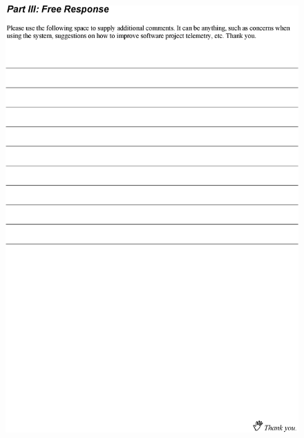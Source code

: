 \begin{figure}[p]
  \includegraphics[height=1.00\textheight]{figures/ClassroomSurveyPage3}
\end{figure}